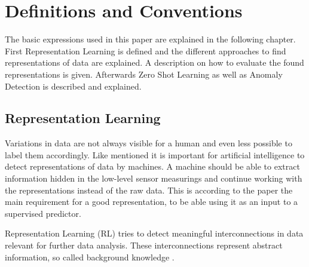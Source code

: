 \section{Definitions and Conventions}\label{theory}
The basic expressions used in this paper are explained in the following chapter. First Representation Learning is defined and the different approaches to find representations of data are explained. A description on how to evaluate the found representations is given. Afterwards Zero Shot Learning as well as Anomaly Detection is described and explained.


\subsection{Representation Learning}
Variations in data are not always visible for a human and even less possible to label them accordingly. Like \cite{bengio_representation_2013} mentioned it is important for artificial intelligence to detect representations of data by machines. A machine should be able to extract information hidden in the low-level sensor measurings and continue working with the representations instead of the raw data. This is according to the paper the main requirement for a good representation, to be able using it as an input to a supervised predictor.

Representation Learning (RL) tries to detect meaningful interconnections in data relevant for further data analysis. These interconnections represent abstract information, so called background knowledge \cite{lavrac_representation_2021}.

